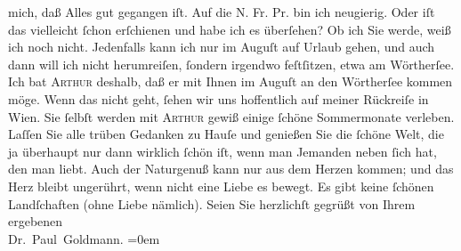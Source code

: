 \begin{ledgroupsized}[t]{13cm}
               mich, daß Alles gut gegangen iſt. Auf die N. Fr.
                  Pr. bin ich neugierig. Oder iſt das \label{K_L03527-3v}\label{K_L03527-3h} vielleicht ſchon
               erſchienen und habe ich es überſehen?\pend
           \pstart
           Ob ich Sie \label{K_L03527-4v}\label{K_L03527-4h}
               werde, weiß ich noch nicht. Jedenfalls kann ich nur im Auguſt auf Urlaub gehen, {\pb}und auch dann
               will ich nicht herumreiſen, ſondern irgendwo feſtſitzen, etwa am Wörtherſee. Ich bat \textsc{Arthur}{ } deshalb,
               daß er mit Ihnen im Auguſt an den Wörtherſee kommen möge. Wenn das nicht geht, ſehen wir uns
               hoffentlich auf meiner Rückreiſe in Wien.\pend
           \pstart
           Sie ſelbſt werden mit \textsc{Arthur} gewiß einige ſchöne {\pb}Sommermonate verleben.
               Laſſen Sie alle trüben Gedanken zu Hauſe und genießen Sie die ſchöne Welt, die ja
               überhaupt nur dann wirklich ſchön iſt, wenn man Jemanden neben ſich hat, den man \strikeout{\textcolor{gray}{l}} liebt. Auch der Naturgenuß kann nur aus dem Herzen kommen; und das Herz bleibt
               ungerührt, wenn nicht eine Liebe es bewegt. Es gibt keine ſchönen Landſchaften (ohne
               Liebe nämlich).\pend
           \pstart
           Seien Sie herzlichſt gegrüßt von Ihrem ergebenen {\\[\baselineskip]}\spacefill\mbox{Dr. Paul
                  Goldmann.}\pend
           \leftskip=0em{}
         
         \endnumbering{}\end{ledgroupsized}\begin{anhang}\end{anhang}\newcommand{\dateiname}{L03527}\newcommand{\titel}{Paul Goldmann an Olga Gussmann, 10. 5. [1901]}\newcommand{\editorInnen}{Martin Anton Müller und Laura Untner}
      